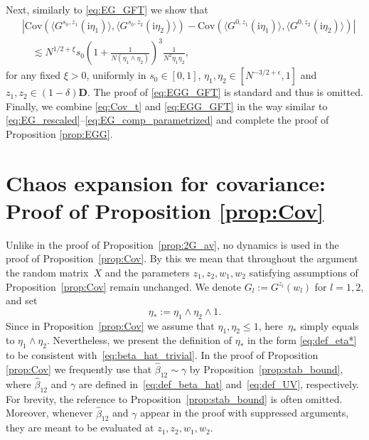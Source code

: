 \documentclass[10pt]{amsart}
\numberwithin{equation}{section}
\newcommand{\Cov}{\mathrm{Cov}}
\newcommand{\ii}{\mathrm{i}}
\begin{document}
Next, similarly to \eqref{eq:EG_GFT} we show that
\begin{equation}
\begin{split}
&\left\vert\Cov\left(\langle G^{s_0,z_1}(\ii\eta_1)\rangle,\langle G^{s_0,z_2}(\ii\eta_2)\rangle\right) - \Cov\left(\langle G^{0,z_1}(\ii\eta_1)\rangle,\langle G^{0,z_2}(\ii\eta_2)\rangle\right)  \right\vert\\
&\quad \lesssim N^{1/2+\xi}s_0 \left(1+\frac{1}{N(\eta_1\wedge\eta_2)}\right)^3 \frac{1}{N^2\eta_1\eta_2},
\end{split}
\label{eq:EGG_GFT}
\end{equation}
for any fixed $\xi>0$, uniformly in $s_0\in [0,1]$, $\eta_1,\eta_2\in [N^{-3/2+\epsilon},1]$ and $z_1,z_2\in (1-\delta)\mathbf{D}$. The proof of \eqref{eq:EGG_GFT} is standard and thus is omitted. Finally, we combine \eqref{eq:Cov_t} and \eqref{eq:EGG_GFT} in the way similar to \eqref{eq:EG_rescaled}--\eqref{eq:EG_comp_parametrized} and complete the proof of Proposition \ref{prop:EGG}.












\section{Chaos expansion for covariance: Proof of Proposition \ref{prop:Cov}}\label{sec:Cov}

Unlike in the proof of Proposition~\ref{prop:2G_av}, no dynamics is used in the proof of Proposition~\ref{prop:Cov}. By this we mean that throughout the argument the random matrix~$X$ and the parameters $z_1,z_2,w_1,w_2$ satisfying assumptions of Proposition~\ref{prop:Cov} remain unchanged. We denote $G_l:=G^{z_l}(w_l)$ for $l=1,2$, and set
\begin{equation}
\eta_*:=\eta_1\wedge\eta_2\wedge 1.
\label{eq:def_eta*}
\end{equation}
Since in Proposition~\ref{prop:Cov} we assume that $\eta_1,\eta_2\le 1$, here~$\eta_*$ simply equals to $\eta_1\wedge\eta_2$. Nevertheless, we present the definition of $\eta_*$ in the form \eqref{eq:def_eta*} to be consistent with~\eqref{eq:beta_hat_trivial}. In the proof of Proposition \ref{prop:Cov} we frequently use that $\widehat{\beta}_{12}\sim \gamma$ by Proposition~\ref{prop:stab_bound}, where $\widehat{\beta}_{12}$ and $\gamma$ are defined in~\eqref{eq:def_beta_hat} and~\eqref{eq:def_UV}, respectively. For brevity, the reference to Proposition~\ref{prop:stab_bound} is often omitted. Moreover, whenever $\widehat{\beta}_{12}$ and $\gamma$ appear in the proof with suppressed arguments, they are meant to be evaluated at $z_1,z_2,w_1,w_2$.
\end{document}
